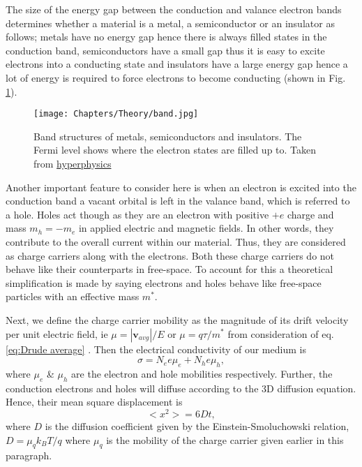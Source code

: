 The size of the energy gap between the conduction and valance electron bands determines whether a material is a metal, a semiconductor or an insulator as follows; metals have no energy gap hence there is always filled states in the conduction band, semiconductors have a small gap thus it is easy to excite electrons into a conducting state and insulators have a large energy gap hence a lot of energy is required to force electrons to become conducting (shown in Fig. \ref{fig:Band}).
\begin{figure}[h]\centering
\texttt{[image: Chapters/Theory/band.jpg]}
\caption{Band structures of metals, semiconductors and insulators. The Fermi level shows where the electron states are filled up to. Taken from \href{http://cnx.org/content/m43554/latest/graphics2.jpg}{hyperphysics}}
\label{fig:Band}
\end{figure}
Another important feature to consider here is when an electron is excited into the conduction band a vacant orbital is left in the valance band, which is referred to a hole. Holes act though as they are an electron with positive $+e$ charge and mass $m_h=-m_e$ in applied electric and magnetic fields. In other words, they contribute to the overall current within our material. Thus, they are considered as charge carriers along with the electrons. Both these charge carriers do not behave like their counterparts in free-space. To account for this a theoretical simplification is made by saying electrons and holes behave like free-space particles with an effective mass $m^*$.

Next, we define the charge carrier mobility as the magnitude of its drift velocity per unit electric field, ie $\mu=|\mathbf{v}_{avg}|/E$ or $\mu=q\tau/m^*$  from consideration of eq. \eqref{eq:Drude average} \cite{intro_solids}. Then the electrical conductivity of our medium is
\begin{equation}
\sigma=N_e e \mu_e + N_h e \mu_h,
\label{eq:carrier conduction}
\end{equation}
where $\mu_e$ \& $\mu_h$ are the electron and hole mobilities respectively. Further, the conduction electrons and holes will diffuse according to the 3D diffusion equation. Hence, their mean square displacement is
\begin{equation}
<x^2>=6Dt,
\label{eq:diffusion}
\end{equation}
where $D$ is the diffusion coefficient given by the Einstein-Smoluchowski relation, $D=\mu_q k_B T / q$ where $\mu_q$ is the mobility of the charge carrier given earlier in this paragraph. 

